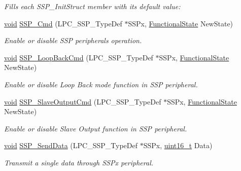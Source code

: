 \begin{DoxyCompactItemize}
\begin{DoxyCompactList}\small\item\em Fills each S\+S\+P\+\_\+\+Init\+Struct member with its default value\+: \end{DoxyCompactList}\item 
\hyperlink{usb__devapi_8h_afabf60e7f57651d6d595a02c75f07cd0}{void} \hyperlink{group___s_s_p___public___functions_ga64abe237d8715fa5641936db6ebc1165}{S\+S\+P\+\_\+\+Cmd} (L\+P\+C\+\_\+\+S\+S\+P\+\_\+\+Type\+Def $\ast$S\+S\+Px, \hyperlink{agilefox_2library_2inc_2stm32f10x__type_8h_ac9a7e9a35d2513ec15c3b537aaa4fba1}{Functional\+State} New\+State)
\begin{DoxyCompactList}\small\item\em Enable or disable S\+SP peripheral\textquotesingle{}s operation. \end{DoxyCompactList}\item 
\hyperlink{usb__devapi_8h_afabf60e7f57651d6d595a02c75f07cd0}{void} \hyperlink{group___s_s_p___public___functions_ga9f13c0eaf5f3f561d094f76aafdd3eed}{S\+S\+P\+\_\+\+Loop\+Back\+Cmd} (L\+P\+C\+\_\+\+S\+S\+P\+\_\+\+Type\+Def $\ast$S\+S\+Px, \hyperlink{agilefox_2library_2inc_2stm32f10x__type_8h_ac9a7e9a35d2513ec15c3b537aaa4fba1}{Functional\+State} New\+State)
\begin{DoxyCompactList}\small\item\em Enable or disable Loop Back mode function in S\+SP peripheral. \end{DoxyCompactList}\item 
\hyperlink{usb__devapi_8h_afabf60e7f57651d6d595a02c75f07cd0}{void} \hyperlink{group___s_s_p___public___functions_gae371c17d5ddbd71d199224463445f767}{S\+S\+P\+\_\+\+Slave\+Output\+Cmd} (L\+P\+C\+\_\+\+S\+S\+P\+\_\+\+Type\+Def $\ast$S\+S\+Px, \hyperlink{agilefox_2library_2inc_2stm32f10x__type_8h_ac9a7e9a35d2513ec15c3b537aaa4fba1}{Functional\+State} New\+State)
\begin{DoxyCompactList}\small\item\em Enable or disable Slave Output function in S\+SP peripheral. \end{DoxyCompactList}\item 
\hyperlink{usb__devapi_8h_afabf60e7f57651d6d595a02c75f07cd0}{void} \hyperlink{group___s_s_p___public___functions_ga6a77261500e4fa65b0ecdfb70ccd8c00}{S\+S\+P\+\_\+\+Send\+Data} (L\+P\+C\+\_\+\+S\+S\+P\+\_\+\+Type\+Def $\ast$S\+S\+Px, \hyperlink{_p_e___types_8h_a1f1825b69244eb3ad2c7165ddc99c956}{uint16\+\_\+t} Data)
\begin{DoxyCompactList}\small\item\em Transmit a single data through S\+S\+Px peripheral. \end{DoxyCompactList}\item 

\end{DoxyCompactItemize}
